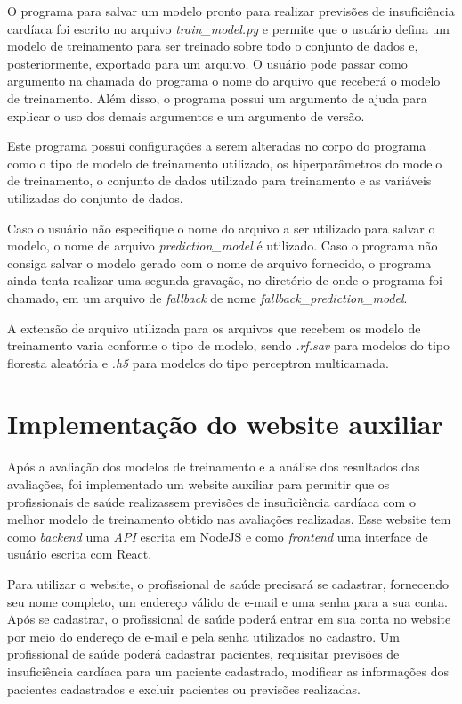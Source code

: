 O programa para salvar um modelo pronto para realizar previsões de insuficiência cardíaca foi escrito no arquivo \textit{train\_model.py} e permite que o usuário defina um modelo de treinamento para ser treinado sobre todo o conjunto de dados\cite{larxel_dataset} e, posteriormente, exportado para um arquivo. O usuário pode passar como argumento na chamada do programa o nome do arquivo que receberá o modelo de treinamento. Além disso, o programa possui um argumento de ajuda para explicar o uso dos demais argumentos e um argumento de versão.

Este programa possui configurações a serem alteradas no corpo do programa como o tipo de modelo de treinamento utilizado, os hiperparâmetros do modelo de treinamento, o conjunto de dados utilizado para treinamento e as variáveis utilizadas do conjunto de dados.

Caso o usuário não especifique o nome do arquivo a ser utilizado para salvar o modelo, o nome de arquivo \textit{prediction\_model} é utilizado. Caso o programa não consiga salvar o modelo gerado com o nome de arquivo fornecido, o programa ainda tenta realizar uma segunda gravação, no diretório de onde o programa foi chamado, em um arquivo de \textit{fallback} de nome \textit{fallback\_prediction\_model}.

A extensão de arquivo utilizada para os arquivos que recebem os modelo de treinamento varia conforme o tipo de modelo, sendo \textit{.rf.sav} para modelos do tipo floresta aleatória e \textit{.h5} para modelos do tipo perceptron multicamada.

\section{Implementação do website auxiliar}

Após a avaliação dos modelos de treinamento e a análise dos resultados das avaliações, foi implementado um website auxiliar para permitir que os profissionais de saúde realizassem previsões de insuficiência cardíaca com o melhor modelo de treinamento obtido nas avaliações realizadas. Esse website tem como \textit{backend} uma \textit{API} escrita em NodeJS e como \textit{frontend} uma interface de usuário escrita com React.

Para utilizar o website, o profissional de saúde precisará se cadastrar, fornecendo seu nome completo, um endereço válido de e-mail e uma senha para a sua conta. Após se cadastrar, o profissional de saúde poderá entrar em sua conta no website por meio do endereço de e-mail e pela senha utilizados no cadastro. Um profissional de saúde poderá cadastrar pacientes, requisitar previsões de insuficiência cardíaca para um paciente cadastrado, modificar as informações dos pacientes cadastrados e excluir pacientes ou previsões realizadas.

